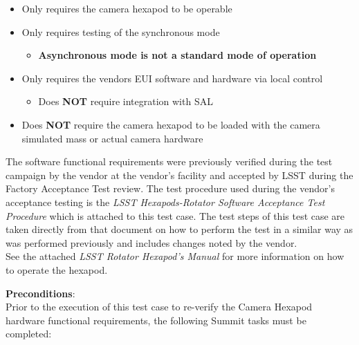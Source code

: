 \documentclass[SE,lsstdraft,STR,toc]{lsstdoc}
\providecommand{\tightlist}{
  \setlength{\itemsep}{0pt}\setlength{\parskip}{0pt}}
\begin{document}
\begin{itemize}
\tightlist
\item
  Only requires the camera hexapod to be operable
\item
  Only requires testing of the synchronous mode

  \begin{itemize}
  \tightlist
  \item
    \textbf{Asynchronous mode is not a standard mode of operation}
  \end{itemize}
\item
  Only requires the vendors EUI software and hardware via local control

  \begin{itemize}
  \tightlist
  \item
    Does \textbf{NOT} require integration with SAL
  \end{itemize}
\item
  Does \textbf{NOT} require the camera hexapod to be loaded with the
  camera simulated mass or actual camera hardware
\end{itemize}

The software functional requirements were previously verified during the
test campaign by the vendor at the vendor's facility and accepted by
LSST during the Factory Acceptance Test review. The test procedure used
during the vendor's acceptance testing is the \emph{LSST
Hexapods-Rotator Software Acceptance Test Procedure} which is attached
to this test case. The test steps of this test case are taken directly
from that document on how to perform the test in a similar way as was
performed previously and includes changes noted by the
vendor.\\[2\baselineskip]See the attached \emph{LSST Rotator Hexapod's
Manual} for more information on how to operate the hexapod.


\textbf{ Preconditions}:\\
Prior to the execution of this test case to re-verify the Camera Hexapod
hardware functional requirements, the following Summit tasks must be
completed:
\end{document}
